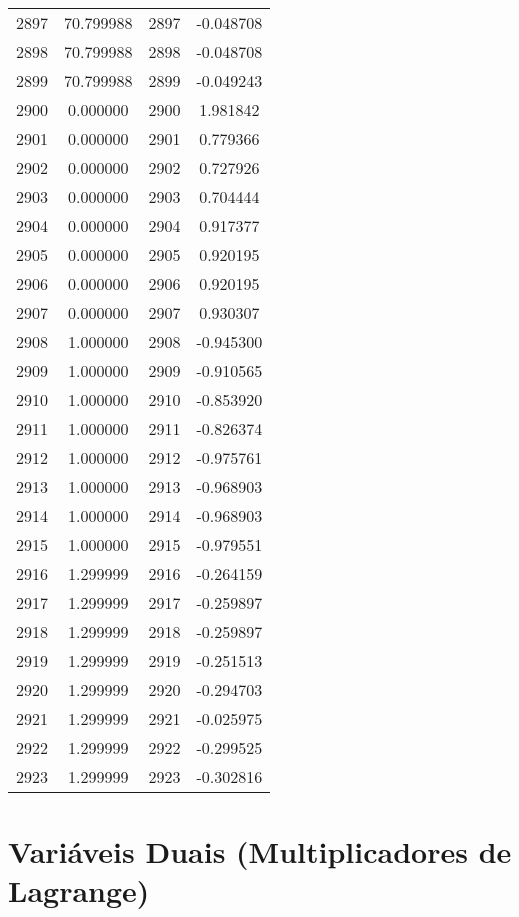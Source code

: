 \documentclass[12pt]{article}
\begin{document}
\begin{longtable}{@{}cccc@{}}
2897 & 70.799988 & 2897 & -0.048708 \\
2898 & 70.799988 & 2898 & -0.048708 \\
2899 & 70.799988 & 2899 & -0.049243 \\
2900 & 0.000000 & 2900 & 1.981842 \\
2901 & 0.000000 & 2901 & 0.779366 \\
2902 & 0.000000 & 2902 & 0.727926 \\
2903 & 0.000000 & 2903 & 0.704444 \\
2904 & 0.000000 & 2904 & 0.917377 \\
2905 & 0.000000 & 2905 & 0.920195 \\
2906 & 0.000000 & 2906 & 0.920195 \\
2907 & 0.000000 & 2907 & 0.930307 \\
2908 & 1.000000 & 2908 & -0.945300 \\
2909 & 1.000000 & 2909 & -0.910565 \\
2910 & 1.000000 & 2910 & -0.853920 \\
2911 & 1.000000 & 2911 & -0.826374 \\
2912 & 1.000000 & 2912 & -0.975761 \\
2913 & 1.000000 & 2913 & -0.968903 \\
2914 & 1.000000 & 2914 & -0.968903 \\
2915 & 1.000000 & 2915 & -0.979551 \\
2916 & 1.299999 & 2916 & -0.264159 \\
2917 & 1.299999 & 2917 & -0.259897 \\
2918 & 1.299999 & 2918 & -0.259897 \\
2919 & 1.299999 & 2919 & -0.251513 \\
2920 & 1.299999 & 2920 & -0.294703 \\
2921 & 1.299999 & 2921 & -0.025975 \\
2922 & 1.299999 & 2922 & -0.299525 \\
2923 & 1.299999 & 2923 & -0.302816 \\

\end{longtable}

\section{Variáveis Duais (Multiplicadores de Lagrange)}
\end{document}
